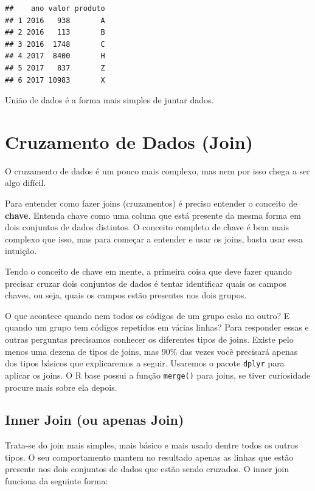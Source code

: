 \documentclass[]{book}
\begin{document}
\begin{verbatim}
##    ano valor produto
## 1 2016   938       A
## 2 2016   113       B
## 3 2016  1748       C
## 4 2017  8400       H
## 5 2017   837       Z
## 6 2017 10983       X
\end{verbatim}

União de dados é a forma mais simples de juntar dados.

\section{Cruzamento de Dados (Join)}\label{cruzamento-de-dados-join}

O cruzamento de dados é um pouco mais complexo, mas nem por isso chega a
ser algo difícil.

Para entender como fazer joins (cruzamentos) é preciso entender o
conceito de \textbf{chave}. Entenda chave como uma coluna que está
presente da mesma forma em dois conjuntos de dados distintos. O conceito
completo de chave é bem mais complexo que isso, mas para começar a
entender e usar os joins, basta usar essa intuição.

Tendo o conceito de chave em mente, a primeira coisa que deve fazer
quando precisar cruzar dois conjuntos de dados é tentar identificar
quais os campos chaves, ou seja, quais os campos estão presentes nos
dois grupos.

O que acontece quando nem todos os códigos de um grupo esão no outro? E
quando um grupo tem códigos repetidos em várias linhas? Para responder
essas e outras perguntas precisamos conhecer os diferentes tipos de
joins. Existe pelo menos uma dezena de tipos de joins, mas 90\% das
vezes você precisará apenas dos tipos básicos que explicaremos a seguir.
Usaremos o pacote \texttt{dplyr} para aplicar os joins. O R base possui
a função \texttt{merge()} para joins, se tiver curiosidade procure mais
sobre ela depois.

\subsection{Inner Join (ou apenas
Join)}\label{inner-join-ou-apenas-join}

Trata-se do join mais simples, mais básico e mais usado dentre todos os
outros tipos. O seu comportamento mantem no resultado apenas as linhas
que estão presente nos dois conjuntos de dados que estão sendo cruzados.
O inner join funciona da seguinte forma:
\end{document}
